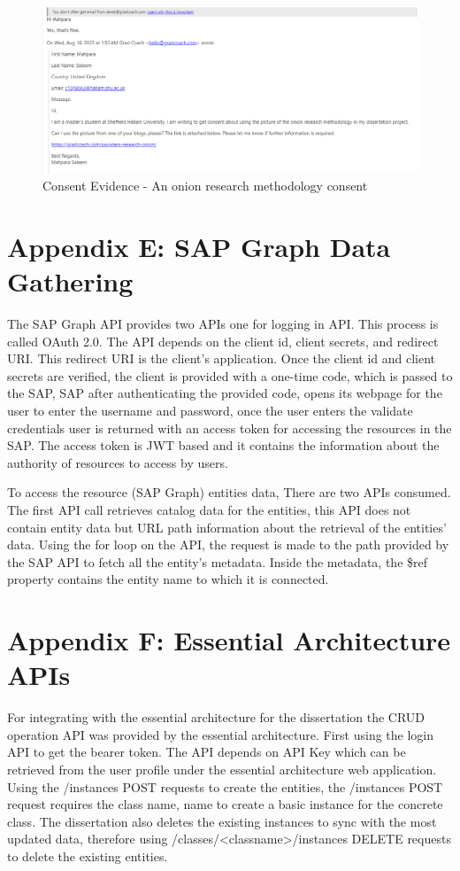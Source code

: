 \documentclass{article}
\begin{document}
\begin{figure}[ht!]
    \centering
    \includegraphics[scale=0.3]{onion-ring-consent}
    \caption{Consent Evidence  - 
An onion research methodology consent }
    \label{fig:onion-research-consent}
\end{figure}

\section{Appendix E: SAP Graph Data Gathering}
The SAP Graph API provides two APIs one for logging in API. This process is called OAuth 2.0. The API depends on the client id, client secrets, and redirect URI. This redirect URI is the client's application. Once the client id and client secrets are verified, the client is provided with a one-time code, which is passed to the SAP, SAP after authenticating the provided code, opens its webpage for the user to enter the username and password, once the user enters the validate credentials user is returned with an access token for accessing the resources in the SAP. The access token is JWT based and it contains the information about the authority of resources to access by users. 

To access the resource (SAP Graph) entities data, There are two APIs consumed. The first API call retrieves catalog data for the entities, this API does not contain entity data but URL path information about the retrieval of the entities' data. Using the for loop on the API, the request is made to the path provided by the SAP API to fetch all the entity's metadata. Inside the metadata, the \$ref property contains the entity name to which it is connected. 

\section{Appendix F: Essential Architecture APIs}
For integrating with the essential architecture for the dissertation the CRUD operation API was provided by the essential architecture. First using the login API to get the bearer token. The API depends on API Key which can be retrieved from the user profile under the essential architecture web application. Using the /instances POST requests to create the entities, the /instances POST request requires the class name, name to create a basic instance for the concrete class. The dissertation also deletes the existing instances to sync with the most updated data, therefore using /classes/<classname>/instances DELETE requests to delete the existing entities.
\end{document}
